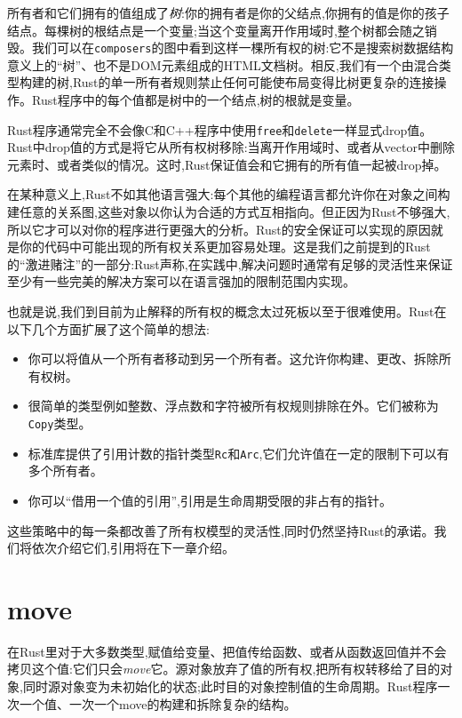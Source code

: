 所有者和它们拥有的值组成了\emph{树}:你的拥有者是你的父结点,你拥有的值是你的孩子结点。每棵树的根结点是一个变量;当这个变量离开作用域时,整个树都会随之销毁。我们可以在\texttt{composers}的图中看到这样一棵所有权的树:它不是搜索树数据结构意义上的“树”、也不是DOM元素组成的HTML文档树。相反,我们有一个由混合类型构建的树,Rust的单一所有者规则禁止任何可能使布局变得比树更复杂的连接操作。Rust程序中的每个值都是树中的一个结点,树的根就是变量。

Rust程序通常完全不会像C和C++程序中使用\texttt{free}和\texttt{delete}一样显式drop值。Rust中drop值的方式是将它从所有权树移除:当离开作用域时、或者从vector中删除元素时、或者类似的情况。这时,Rust保证值会和它拥有的所有值一起被drop掉。

在某种意义上,Rust不如其他语言强大:每个其他的编程语言都允许你在对象之间构建任意的关系图,这些对象以你认为合适的方式互相指向。但正因为Rust不够强大,所以它才可以对你的程序进行更强大的分析。Rust的安全保证可以实现的原因就是你的代码中可能出现的所有权关系更加容易处理。这是我们之前提到的Rust的“激进赌注”的一部分:Rust声称,在实践中,解决问题时通常有足够的灵活性来保证至少有一些完美的解决方案可以在语言强加的限制范围内实现。

也就是说,我们到目前为止解释的所有权的概念太过死板以至于很难使用。Rust在以下几个方面扩展了这个简单的想法:
\begin{itemize}
    \item 你可以将值从一个所有者移动到另一个所有者。这允许你构建、更改、拆除所有权树。
    \item 很简单的类型例如整数、浮点数和字符被所有权规则排除在外。它们被称为\texttt{Copy}类型。
    \item 标准库提供了引用计数的指针类型\texttt{Rc}和\texttt{Arc},它们允许值在一定的限制下可以有多个所有者。
    \item 你可以“借用一个值的引用”,引用是生命周期受限的非占有的指针。
\end{itemize}

这些策略中的每一条都改善了所有权模型的灵活性,同时仍然坚持Rust的承诺。我们将依次介绍它们,引用将在下一章介绍。

\section{move}
在Rust里对于大多数类型,赋值给变量、把值传给函数、或者从函数返回值并不会拷贝这个值:它们只会\emph{move}它。源对象放弃了值的所有权,把所有权转移给了目的对象,同时源对象变为未初始化的状态;此时目的对象控制值的生命周期。Rust程序一次一个值、一次一个move的构建和拆除复杂的结构。

